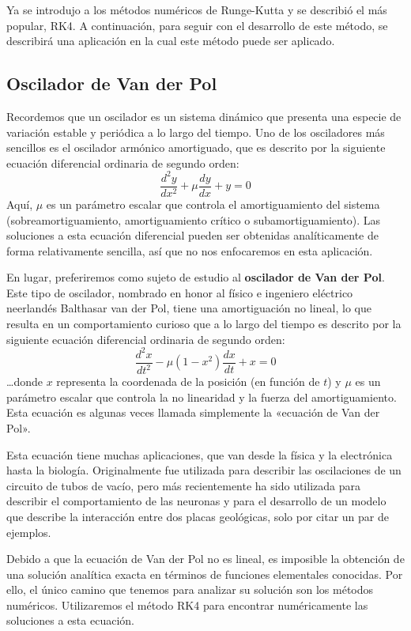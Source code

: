 \documentclass[12pt, a4paper]{article}
\begin{document}
Ya se introdujo a los métodos numéricos de Runge-Kutta y se describió el más popular, RK4. A continuación, para seguir con el desarrollo de este método, se describirá una aplicación en la cual este método puede ser aplicado.

\subsection{Oscilador de Van der Pol}

Recordemos que un oscilador es un sistema dinámico que presenta una especie de variación estable y periódica a lo largo del tiempo. Uno de los osciladores más sencillos es el oscilador armónico amortiguado, que es descrito por la siguiente ecuación diferencial ordinaria de segundo orden:
\[
	\frac{d^2 y}{dx^2} + \mu \frac{dy}{dx} + y = 0
\]
Aquí, \(\mu\) es un parámetro escalar que controla el amortiguamiento del sistema (sobreamortiguamiento, amortiguamiento crítico o subamortiguamiento). Las soluciones a esta ecuación diferencial pueden ser obtenidas analíticamente de forma relativamente sencilla, así que no nos enfocaremos en esta aplicación.

En lugar, preferiremos como sujeto de estudio al \textbf{oscilador de Van der Pol}. Este tipo de oscilador, nombrado en honor al físico e ingeniero eléctrico neerlandés Balthasar van der Pol, tiene una amortiguación no lineal, lo que resulta en un comportamiento curioso que a lo largo del tiempo es descrito por la siguiente ecuación diferencial ordinaria de segundo orden:
\begin{equation} \label{eq:van-der-pol}
	\frac{d^2 x}{dt^2} - \mu (1 - x^{2}) \frac{dx}{dt} + x = 0
\end{equation}
…donde \(x\) representa la coordenada de la posición (en función de \(t\)) y \(\mu\) es un parámetro escalar que controla la no linearidad y la fuerza del amortiguamiento. Esta ecuación es algunas veces llamada simplemente la «ecuación de Van der Pol».

Esta ecuación tiene muchas aplicaciones, que van desde la física y la electrónica hasta la biología. Originalmente fue utilizada para describir las oscilaciones de un circuito de tubos de vacío, pero más recientemente ha sido utilizada para describir el comportamiento de las neuronas y para el desarrollo de un modelo que describe la interacción entre dos placas geológicas, solo por citar un par de ejemplos.

Debido a que la ecuación de Van der Pol no es lineal, es imposible la obtención de una solución analítica exacta en términos de funciones elementales conocidas. Por ello, el único camino que tenemos para analizar su solución son los métodos numéricos. Utilizaremos el método RK4 para encontrar numéricamente las soluciones a esta ecuación.
\end{document}
